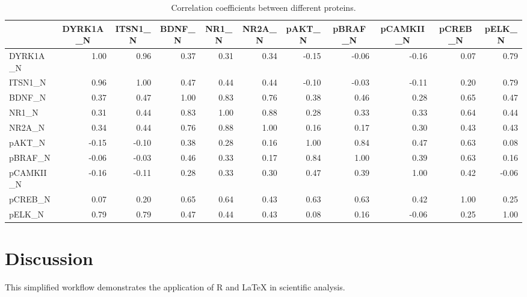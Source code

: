 \documentclass[letterpaper,11pt]{article}
\begin{document}
\begin{table}[ht]
\centering
\begin{adjustbox}{width=\textwidth}
\begin{tabular}{lrrrrrrrrrr}
  \hline
 & \multicolumn{1}{c}{DYRK1A\_N} & \multicolumn{1}{c}{ITSN1\_N} & \multicolumn{1}{c}{BDNF\_N} & \multicolumn{1}{c}{NR1\_N} & \multicolumn{1}{c}{NR2A\_N} & \multicolumn{1}{c}{pAKT\_N} & \multicolumn{1}{c}{pBRAF\_N} & \multicolumn{1}{c}{pCAMKII\_N} & \multicolumn{1}{c}{pCREB\_N} & \multicolumn{1}{c}{pELK\_N} \\ 
  \hline
DYRK1A\_N & 1.00 & 0.96 & 0.37 & 0.31 & 0.34 & -0.15 & -0.06 & -0.16 & 0.07 & 0.79 \\ 
ITSN1\_N & 0.96 & 1.00 & 0.47 & 0.44 & 0.44 & -0.10 & -0.03 & -0.11 & 0.20 & 0.79 \\ 
BDNF\_N & 0.37 & 0.47 & 1.00 & 0.83 & 0.76 & 0.38 & 0.46 & 0.28 & 0.65 & 0.47 \\ 
NR1\_N & 0.31 & 0.44 & 0.83 & 1.00 & 0.88 & 0.28 & 0.33 & 0.33 & 0.64 & 0.44 \\ 
NR2A\_N & 0.34 & 0.44 & 0.76 & 0.88 & 1.00 & 0.16 & 0.17 & 0.30 & 0.43 & 0.43 \\ 
pAKT\_N & -0.15 & -0.10 & 0.38 & 0.28 & 0.16 & 1.00 & 0.84 & 0.47 & 0.63 & 0.08 \\ 
pBRAF\_N & -0.06 & -0.03 & 0.46 & 0.33 & 0.17 & 0.84 & 1.00 & 0.39 & 0.63 & 0.16 \\ 
pCAMKII\_N & -0.16 & -0.11 & 0.28 & 0.33 & 0.30 & 0.47 & 0.39 & 1.00 & 0.42 & -0.06 \\ 
pCREB\_N & 0.07 & 0.20 & 0.65 & 0.64 & 0.43 & 0.63 & 0.63 & 0.42 & 1.00 & 0.25 \\ 
pELK\_N & 0.79 & 0.79 & 0.47 & 0.44 & 0.43 & 0.08 & 0.16 & -0.06 & 0.25 & 1.00 \\ 
  \hline
\end{tabular}
\end{adjustbox}
\caption{Correlation coefficients between different proteins.}
\label{tab:protein_correlations}
\end{table}



\section{Discussion}
This simplified workflow demonstrates the application of R and LaTeX in scientific analysis.



\end{document}
